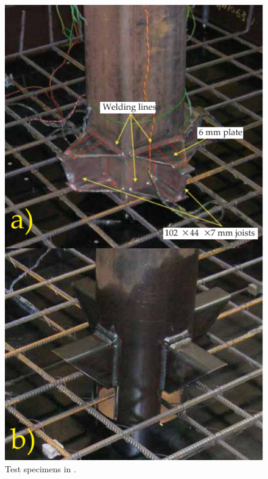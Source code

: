     \begin{figure}\centering
    \includegraphics[width=\columnwidth]{Figures/y2014f2.pdf}
    \caption{Test specimens in \cite{yan2014}.}
    \label{l2014f2}
    \end{figure}
